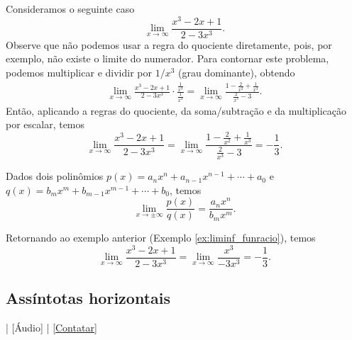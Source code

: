 \begin{ex}\label{ex:liminf_funracio}
  Consideramos o seguinte caso
  \begin{equation}
    \lim_{x\to \infty} \frac{x^3 - 2x + 1}{2 - 3x^3}.
  \end{equation}
  Observe que não podemos usar a regra do quociente diretamente, pois, por exemplo, não existe o limite do numerador. Para contornar este problema, podemos multiplicar e dividir por $1/x^3$ (grau dominante), obtendo
  \begin{align}
    \lim_{x\to\infty} \frac{x^3 - 2x + 1}{2 - 3x^3}\cdot\frac{\frac{1}{x^3}}{\frac{1}{x^3}} = \lim_{x\to\infty} \frac{1-\frac{2}{x^2} + \frac{1}{x^3}}{\frac{2}{x^3}-3}. 
  \end{align}
  Então, aplicando a regras do quociente, da soma/subtração e da multiplicação por escalar, temos
  \begin{equation}
    \lim_{x\to\infty} \frac{x^3 - 2x + 1}{2 - 3x^3} = \lim_{x\to\infty} \frac{1-\frac{2}{x^2} + \frac{1}{x^3}}{\frac{2}{x^3}-3} = -\frac{1}{3}.
  \end{equation}
\end{ex}

\begin{obs}\label{obs:lim_xinf_racio}
  Dados dois polinômios $p(x) = a_nx^n+a_{n-1}x^{n-1}+\cdots + a_0$ e $q(x) = b_mx^m+b_{m-1}x^{m-1}+\cdots + b_0$, temos
  \begin{equation}
    \lim_{x\to \pm\infty} \frac{p(x)}{q(x)} = \frac{a_nx^n}{b_mx^m}.
  \end{equation}
\end{obs}

\begin{ex}
  Retornando ao exemplo anterior (Exemplo \ref{ex:liminf_funracio}), temos
  \begin{equation}
    \lim_{x\to\infty} \frac{x^3 - 2x + 1}{2 - 3x^3} = \lim_{x\to\infty} \frac{x^3}{-3x^3} = -\frac{1}{3}.
  \end{equation}
\end{ex}

\subsection{Assíntotas horizontais}

\begin{flushright}
  [Vídeo] | [Áudio] | \href{https://phkonzen.github.io/notas/contato.html}{[Contatar]}
\end{flushright}

